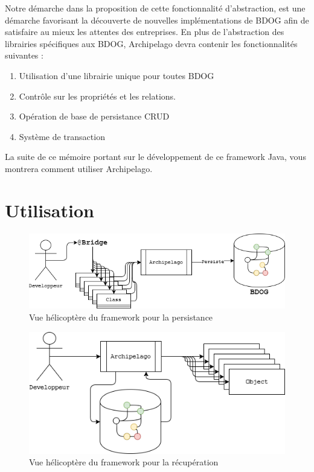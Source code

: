 \documentclass[a4paper,fleqn,12pt,oneside]{report}
\begin{document}
Notre démarche dans la proposition de cette fonctionnalité d'abstraction, est une démarche favorisant la découverte de nouvelles implémentations de BDOG afin de satisfaire au mieux les attentes des entreprises. En plus de l'abstraction des librairies spécifiques aux BDOG, Archipelago devra contenir les fonctionnalités suivantes :
 
\begin{enumerate}
\item Utilisation d'une librairie unique pour toutes BDOG
\item Contrôle sur les propriétés et les relations.
\item Opération de base de persistance CRUD
\item Système de transaction 
\end{enumerate}

La suite de ce mémoire portant sur le développement de ce framework Java, vous montrera comment utiliser Archipelago.
\section{Utilisation}
\begin{figure}[!ht]
\centering
\includegraphics[scale=0.7]{figures/HelocoP.png}
\caption{Vue hélicoptère du framework pour la persistance}
\label{fig:HelocoP}
\end{figure}
\begin{figure}[!ht]
\centering
\includegraphics[scale=0.8]{figures/HelocoG.png}
\caption{Vue hélicoptère du framework pour la récupération}
\label{fig:HelocoG}
\end{figure}
\newpage
\label{opérations}
\end{document}
